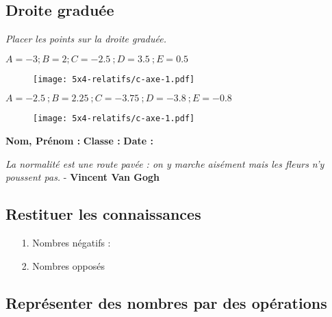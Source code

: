 \subsection*{Droite graduée}

\textit{Placer les points sur la droite graduée.}

$A = -3 ; B = 2 ; C = \SI{-2,5}{} ; D = \SI{3,5}{} ; E = \SI{0,5}{}$

\begin{figure}[H]
  \centering
  \texttt{[image: 5x4-relatifs/c-axe-1.pdf]}
\end{figure}

$A = \SI{-2,5}{} ; B = \SI{2,25}{} ; C = \SI{-3,75}{} ; D = \SI{-3,8}{} ; E = \SI{-0,8}{}$

\begin{figure}[H]
  \centering
  \texttt{[image: 5x4-relatifs/c-axe-1.pdf]}
\end{figure}

\newpage


\textbf{Nom, Prénom :} \hspace{8cm} \textbf{Classe :} \hspace{3cm} \textbf{Date :}\\

\begin{center}
  \textit{La normalité est une route pavée : on y marche aisément mais les fleurs n’y poussent pas.}  - \textbf{Vincent Van Gogh}
\end{center}

\subsection*{Restituer les connaissances}

\begin{enumerate}
  \item[1.] Nombres négatifs : \dotfill \\
  \item[2.] Nombres opposés \dotfill \\
\end{enumerate}

\subsection*{Représenter des nombres par des opérations}

